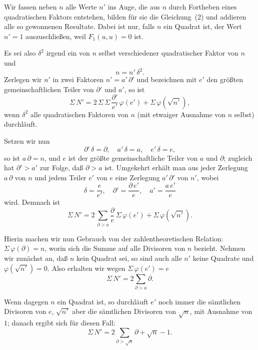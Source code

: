 \documentclass[12pt,a4paper]{article}
\theoremstyle{weber}
\begin{document}
Wir fassen neben $n$ alle Werte $n'$ ins Auge, die aus $n$ durch Fortheben eines quadratischen Faktors entstehen, bilden für sie die Gleichung~(2) und addieren alle so gewonnenen Resultate. Dabei ist nur, falls $n$ ein Quadrat ist, der Wert $n' = 1$ auszuschließen, weil $F_1(u, u) = 0$ ist.

Es sei also $\delta^2$ irgend ein von $n$ selbst verschiedener quadratischer Faktor von $n$ und
\[
n = n'\,\delta^2.
\]
Zerlegen wir $n'$ in zwei Faktoren $n' = a'\,\partial'$ und bezeichnen mit $e'$ den größten gemeinschaftlichen Teiler von $\partial'$ und $a'$, so ist
\begin{equation}
\Sigma\,N' = 2\,\Sigma\,\Sigma\,\frac{\partial'}{e'}\,\varphi(e') + \Sigma\,\varphi(\sqrt{n'}),
\end{equation}
wenn $\delta^2$ alle quadratischen Faktoren von $n$ (mit etwaiger Ausnahme von $n$ selbst) durchläuft.

Setzen wir nun
\[
\partial'\,\delta = \partial, \quad a'\,\delta = a, \quad e'\,\delta = e,
\]
so ist $a\,\partial = n$, und $e$ ist der größte gemeinschaftliche Teiler von $a$ und $\partial$; zugleich hat $\partial' > a'$ zur Folge, daß $\partial > a$ ist. Umgekehrt erhält man aus jeder Zerlegung $a\,\partial$ von $n$ und jedem Teiler $e'$ von $e$ eine Zerlegung $a'\,\partial'$ von $n'$, wobei
\[
\delta = \frac{e}{e'}, \quad \partial' = \frac{\partial\,e'}{e}, \quad a' = \frac{a\,e'}{e}
\]
wird. Demnach ist
\begin{equation}
\Sigma\,N' = 2\,\sum_{\partial > a} \frac{\partial}{e}\,\Sigma\,\varphi(e') + \Sigma\,\varphi(\sqrt{n'}).
\end{equation}

Hierin machen wir nun Gebrauch von der zahlentheoretischen Relation: $\Sigma\,\varphi(\partial) = n$, worin sich die Summe auf alle Divisoren von $n$ bezieht. Nehmen wir zunächst an, daß $n$ kein Quadrat sei, so sind auch alle $n'$ keine Quadrate und $\varphi(\sqrt{n'}) = 0$. Also erhalten wir wegen $\Sigma\,\varphi(e') = e$
\begin{equation}
\Sigma\,N' = 2\sum_{\partial > a} \partial.
\end{equation}

Wenn dagegen $n$ ein Quadrat ist, so durchläuft $e'$ noch immer die sämtlichen Divisoren von $e$, $\sqrt{n'}$ aber die sämtlichen Divisoren von $\sqrt{n}$, mit Ausnahme von $1$; danach ergibt sich für diesen Fall:
\begin{equation}
\Sigma\,N' = 2\sum_{\partial > \sqrt{n}} \partial + \sqrt{n} - 1.
\end{equation}
\end{document}
